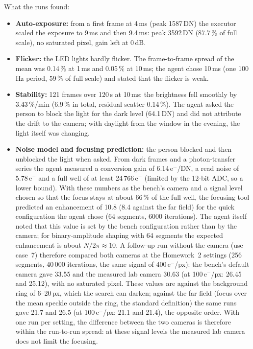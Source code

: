 \documentclass[11pt,a4paper]{article}
\begin{document}
{\footnotesize}
What the runs found:
\begin{itemize}[leftmargin=*,itemsep=1pt]
\item \textbf{Auto-exposure:} from a first frame at 4\,ms (peak 1587\,DN) the executor scaled the exposure to 9\,ms and then
9.4\,ms: peak 3592\,DN (87.7\,\% of full scale), no saturated pixel, gain left at 0\,dB.
\item \textbf{Flicker:} the LED lights hardly flicker. The frame-to-frame spread of the mean was 0.14\,\% at 1\,ms and
0.05\,\% at 10\,ms; the agent chose 10\,ms (one 100\,Hz period, 59\,\% of full scale) and stated that the flicker is weak.
\item \textbf{Stability:} 121 frames over 120\,s at 10\,ms: the brightness fell smoothly by 3.43\,\%/min (6.9\,\% in
total, residual scatter 0.14\,\%). The agent asked the person to block the light for the dark level (64.1\,DN) and
did not attribute the drift to the camera; with daylight from the window in the evening, the light itself was changing.
\item \textbf{Noise model and focusing prediction:} the person blocked and then unblocked the light when asked. From dark
frames and a photon-transfer series the agent measured a conversion gain of 6.14\,e$^-$/DN, a read noise of 5.78\,e$^-$ and
a full well of at least 24\,766\,e$^-$ (limited by the 12-bit ADC, so a lower bound). With these numbers as the bench's
camera and a signal level chosen so that the focus stays at about 66\,\% of the full well, the focusing tool predicted an
enhancement of 10.8 (8.4 against the far field) for the quick configuration the agent chose (64 segments, 6000
iterations). The agent itself noted
that this value is set by the bench configuration rather than by the camera; for binary-amplitude shaping with 64
segments the expected enhancement is about $N/2\pi \approx 10$. A follow-up run without the camera (use case~7) therefore
compared both cameras at the Homework~2 settings (256 segments, 40\,000 iterations, the same signal of 400\,e$^-$/px): the
bench's default camera gave 33.55 and the measured lab camera 30.63 (at 100\,e$^-$/px: 26.45 and 25.12), with no saturated
pixel. These values are against the background ring of 6--20\,px, which the search can darken; against the far field
(focus over the mean speckle outside the ring, the standard definition) the same runs gave 21.7 and 26.5 (at
100\,e$^-$/px: 21.1 and 21.4), the opposite order. With one run per setting, the difference between the two cameras is
therefore within the run-to-run spread: at these signal levels the measured lab camera does not limit the focusing.

\end{itemize}
\end{document}
